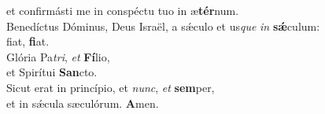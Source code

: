\oddverse et confirmásti me in conspéctu tuo in æ\textbf{tér}num.\\
\evenverse Benedíctus Dóminus, Deus Israël, a sǽculo et us\textit{que} \textit{in} \textbf{sǽ}culum:~\*\\
\evenverse fiat, \textbf{fi}at.\\
\oddverse Glória Pa\textit{tri}, \textit{et} \textbf{Fí}lio,~\*\\
\oddverse et Spirítui \textbf{San}cto.\\
\evenverse Sicut erat in princípio, et \textit{nunc}, \textit{et} \textbf{sem}per,~\*\\
\evenverse et in sǽcula sæculórum. \textbf{A}men.\\

